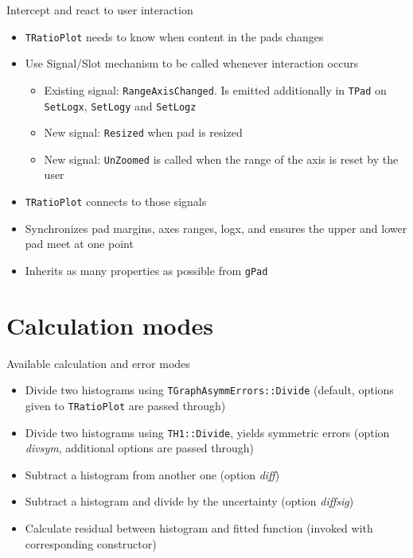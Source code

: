 \documentclass{beamer}
\begin{document}
\begin{frame}[t]{Intercept and react to user interaction}
  \begin{itemize}
    \item \texttt{TRatioPlot} needs to know when content in the pads changes
    \item Use Signal/Slot mechanism to be called whenever interaction occurs
      \begin{itemize}
        \item Existing signal: \texttt{RangeAxisChanged}. Is emitted additionally in \texttt{TPad} on \texttt{SetLogx}, \texttt{SetLogy} and \texttt{SetLogz}
        \item New signal: \texttt{Resized} when pad is resized
        \item New signal: \texttt{UnZoomed} is called when the range of the axis is reset by the user
      \end{itemize}
    \item \texttt{TRatioPlot} connects to those signals
    \item Synchronizes pad margins, axes ranges, logx, and ensures the upper and lower pad meet at one point
    \item Inherits as many properties as possible from \texttt{gPad}
  \end{itemize}
\end{frame}

\section{Calculation modes}

\begin{frame}[t]{Available calculation and error modes}
  \begin{itemize}
    \item Divide two histograms using \texttt{TGraphAsymmErrors::Divide} (default, options given to \texttt{TRatioPlot} are passed through)
    \item Divide two histograms using \texttt{TH1::Divide}, yields symmetric errors (option \emph{divsym}, additional options are passed through)
    \item Subtract a histogram from another one (option \emph{diff})
    \item Subtract a histogram and divide by the uncertainty (option \emph{diffsig})
    \item Calculate residual between histogram and fitted function (invoked with corresponding constructor)
  \end{itemize}
\end{frame}
\end{document}
